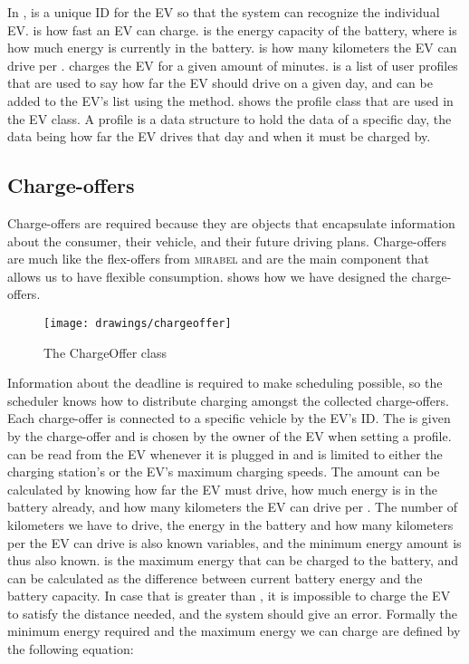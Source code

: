 In ,  is a unique ID for the EV so that the system can recognize the individual EV.  is how fast an EV can charge.  is the energy capacity of the battery, where  is how much energy is currently in the battery.  is how many kilometers the EV can drive per \kwh{}.  charges the EV for a given amount of minutes.  is a list of user profiles that are used to say how far the EV should drive on a given day, and can be added to the EV's list using the  method.  shows the profile class that are used in the EV class. A profile is a data structure to hold the data of a specific day, the data being how far the EV drives that day and when it must be charged by. 

\subsection{Charge-offers}\label{sec:charge-offers}

Charge-offers are required because they are objects that encapsulate information about the consumer, their vehicle, and their future driving plans. Charge-offers are much like the flex-offers from \textsc{mirabel} and are the main component that allows us to have flexible consumption.  shows how we have designed the charge-offers.

\begin{figure}[hptb]
	\centering
	\texttt{[image: drawings/chargeoffer]}
	\caption{The ChargeOffer class}\label{fig:UMLCO}
\end{figure}

Information about the deadline is required to make scheduling possible, so the scheduler knows how to distribute charging amongst the collected charge-offers. Each charge-offer is connected to a specific vehicle by the EV's ID. The  is given by the charge-offer and is chosen by the owner of the EV when setting a profile.  can be read from the EV whenever it is plugged in and is limited to either the charging station's or the EV's maximum charging speeds. The  amount can be calculated by knowing how far the EV must drive, how much energy is in the battery already, and how many kilometers the EV can drive per \kwh{}. The number of kilometers we have to drive, the energy in the battery and how many kilometers per \kwh{} the EV can drive is also known variables, and the minimum energy amount is thus also known.  is the maximum energy that can be charged to the battery, and can be calculated as the difference between current battery energy and the battery capacity. In case that  is greater than , it is impossible to charge the EV to satisfy the distance needed, and the system should give an error. Formally the minimum energy required and the maximum energy we can charge are defined by the following equation:


